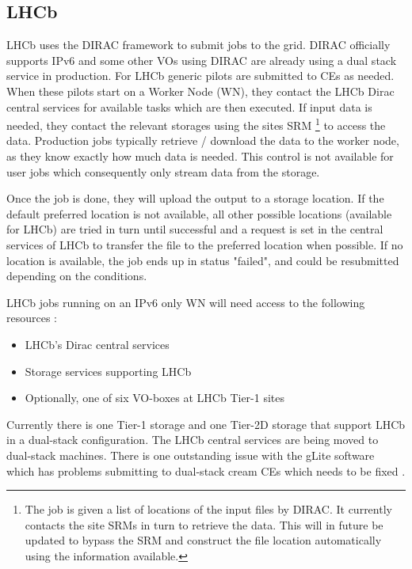 \documentclass[11pt]{article}
\begin{document}


\subsection{LHCb}
LHCb uses the DIRAC framework to submit jobs to the grid. DIRAC officially supports IPv6 and some other VOs using DIRAC are already using a dual stack service in production.  For LHCb generic pilots are submitted to CEs as needed. When these pilots start on a Worker Node (WN), they contact the LHCb Dirac central services for available tasks which are then executed. If input data is needed, they contact the relevant storages using the sites SRM \footnote{The job is given a list of locations of the input files by DIRAC. It currently contacts the site SRMs in turn to retrieve the data. This will in future be updated to bypass the SRM and construct the file location automatically using the information available.} to access the data.  Production jobs typically retrieve / download the data to the worker node, as they know exactly how much data is needed. This control is not available for user jobs which consequently only stream data from the storage.

Once the job is done, they will upload the output to a storage location. If the default preferred location is not available, all other possible locations (available for LHCb) are tried in turn until successful and a request is set in the central services of LHCb to transfer the file to the preferred location when possible. If no location is available, the job ends up in status "failed", and could be resubmitted depending on the conditions.

LHCb jobs running on an IPv6 only WN will need access to the following resources :
\begin{itemize}
\item LHCb's Dirac central services
\item Storage services supporting LHCb
\item Optionally, one of six VO-boxes at LHCb Tier-1 sites
\end{itemize}
Currently there is one Tier-1 storage and one Tier-2D storage that support LHCb in a dual-stack configuration.  The LHCb central services are being moved to dual-stack machines.  There is one outstanding issue with the gLite software which has problems submitting to dual-stack cream CEs which needs to be fixed \cite{CreamCEBug}.
\end{document}
